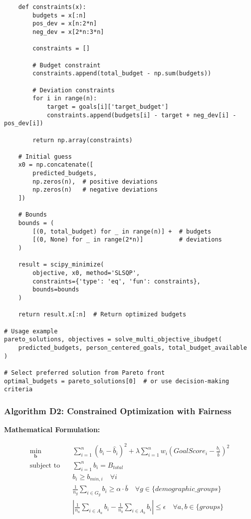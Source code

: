 \begin{lstlisting}
    def constraints(x):
        budgets = x[:n]
        pos_dev = x[n:2*n]
        neg_dev = x[2*n:3*n]
        
        constraints = []
        
        # Budget constraint
        constraints.append(total_budget - np.sum(budgets))
        
        # Deviation constraints
        for i in range(n):
            target = goals[i]['target_budget']
            constraints.append(budgets[i] - target + neg_dev[i] - pos_dev[i])
        
        return np.array(constraints)
    
    # Initial guess
    x0 = np.concatenate([
        predicted_budgets,
        np.zeros(n),  # positive deviations
        np.zeros(n)   # negative deviations
    ])
    
    # Bounds
    bounds = (
        [(0, total_budget) for _ in range(n)] +  # budgets
        [(0, None) for _ in range(2*n)]          # deviations
    )
    
    result = scipy_minimize(
        objective, x0, method='SLSQP',
        constraints={'type': 'eq', 'fun': constraints},
        bounds=bounds
    )
    
    return result.x[:n]  # Return optimized budgets

# Usage example
pareto_solutions, objectives = solve_multi_objective_ibudget(
    predicted_budgets, person_centered_goals, total_budget_available
)

# Select preferred solution from Pareto front
optimal_budgets = pareto_solutions[0]  # or use decision-making criteria
\end{lstlisting}

\subsubsection{Algorithm D2: Constrained Optimization with Fairness}

\textbf{Mathematical Formulation:}

\begin{align}
\min_{\mathbf{b}} \quad & \sum_{i=1}^n \left(b_i - \hat{b}_i\right)^2 + \lambda \sum_{i=1}^n w_i \left(GoalScore_i - \frac{b_i}{\bar{b}}\right)^2 \\
\text{subject to} \quad & \sum_{i=1}^n b_i = B_{total} \\
& b_i \geq b_{min,i} \quad \forall i \\
& \frac{1}{n_g} \sum_{i \in G_g} b_i \geq \alpha \cdot \bar{b} \quad \forall g \in \{demographic\_groups\} \\
& \left|\frac{1}{n_a} \sum_{i \in A_a} b_i - \frac{1}{n_b} \sum_{i \in A_b} b_i\right| \leq \epsilon \quad \forall a,b \in \{groups\}
\end{align}

